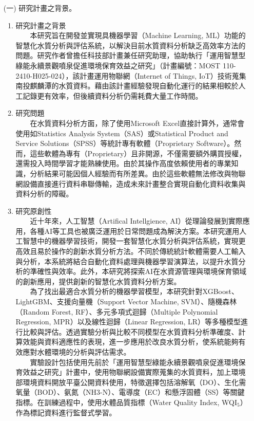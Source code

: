 \documentclass[12pt,a4paper]{article}
\begin{document}

\begin{enumerate}
\item[(一)] 研究計畫之背景。
\begin{enumerate}[label=\arabic*.]
\item 研究計畫之背景\\
　　本研究旨在開發並實現具機器學習（Machine Learning, ML）功能的智慧化水質分析與評估系統，以解決目前水質資料分析缺乏高效率方法的問題。研究作者曾擔任科技部計畫兼任研究助理，協助執行「運用智慧型綠能永續景觀噴泉促進環境保育效益之研究」（計畫編號：MOST 110-2410-H025-024），該計畫運用物聯網（Internet of Things, IoT）技術蒐集南投麒麟潭的水質資料。藉由該計畫經驗發現自動化運行的結果相較於人工記錄更有效率，但後續資料分析仍需耗費大量工作時間。
\item 研究問題\\
　　在水質資料分析方面，除了使用Microsoft Excel直接計算外，通常會使用如Statistics Analysis System（SAS）或Statistical Product and Service Solutions（SPSS）等統計專有軟體（Proprietary Software）。然而，這些軟體為專有（Proprietary）且非開源，不僅需要額外購買授權，還需投入時間學習才能熟練使用。由於其操作高度依賴使用者的專業知識，分析結果可能因個人經驗而有所差異。由於這些軟體無法修改與物聯網設備直接進行資料串聯傳輸，造成未來計畫整合實現自動化資料收集與資料分析的障礙。
\item 研究原創性\\
　　近十年來，人工智慧（Artifical Intellgience, AI）從理論發展到實際應用，各種AI等工具也被廣泛運用於日常問題成為解決方案\cite{ref1}。本研究運用人工智慧中的機器學習技術，開發一套智慧化水質分析與評估系統，實現更高效且易於操作的創新水質分析方法。不同於傳統統計軟體需要人工輸入與分析，本系統將結合自動化資料處理與機器學習演算法，以提升水質分析的準確性與效率。此外，本研究將探索AI在水資源管理與環境保育領域的創新應用，提供創新的智慧化水質資料分析方案。\\  
　　為了找出最適合水質分析的機器學習模型，本研究針對XGBoost、LightGBM、支援向量機（Support Vector Machine, SVM）、隨機森林（Random Forest, RF）、多元多項式迴歸（Multiple Polynomial Regression, MPR）以及線性迴歸（Linear Regression, LR）等多種模型進行比較與評估。透過實驗分析與比較不同模型在水質資料分析準確度、計算效能與資料適應性的表現，進一步應用於改良水質分析，使系統能夠有效應對水體環境的分析與評估需求。\\
　　實驗設計包括使用先前於「運用智慧型綠能永續景觀噴泉促進環境保育效益之研究」計畫中，使用物聯網設備實際蒐集的水質資料，加上環境部環境資料開放平臺公開資料使用，特徵選擇包括溶解氧（DO）、生化需氧量（BOD）、氨氮（NH3-N）、電導度（EC）和懸浮固體（SS）等關鍵指標。在訓練過程中，使用水體品質指標（Water Quality Index, WQI$_5$）作為標記資料進行監督式學習。

\end{enumerate}
\end{enumerate}
\end{document}
